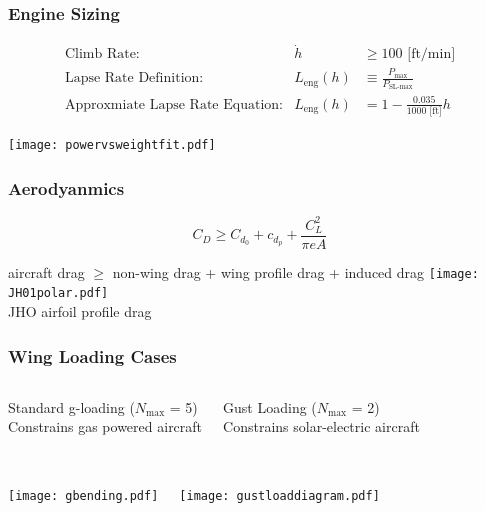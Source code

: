 \documentclass{beamer}
\begin{document}
\begin{frame}
    \frametitle{Engine Sizing}

    \scriptsize
    \[ \begin{array}{rrl}
            \text{Climb Rate}: & \dot{h} &\geq 100 \text{ [ft/min]} \\
            \text{Lapse Rate Definition}: &L_{\text{eng}}(h) &\equiv \frac{P_{\text{max}}}{P_{\text{SL-max}}} \\
            \text{Approxmiate Lapse Rate Equation}: & L_{\text{eng}}(h) &= 1 - \frac{0.035}{1000 \text{ [ft]}} h
    \end{array} \]

    \begin{center}
    \texttt{[image: powervsweightfit.pdf]}
    \end{center}

\end{frame}

\begin{frame}
    \frametitle{Aerodyanmics}

    \[ C_D \geq C_{d_0} + c_{d_p} + \frac{C_L^2}{\pi e A} \]

    \begin{center}
    aircraft drag $\geq$ non-wing drag + wing profile drag + induced drag
    \texttt{[image: JH01polar.pdf]} \\
    \scriptsize
    JHO airfoil profile drag
    \end{center}
    
\end{frame}

\begin{frame}
    \frametitle{Wing Loading Cases}
      
    \begin{columns}
        \begin{center}
        Standard g-loading ($N_{\text{max}}$ = 5) \\
        Constrains gas powered aircraft \\~\\
        \end{center}
        
        \begin{center}
        Gust Loading ($N_{\text{max}}$ = 2) \\
        Constrains solar-electric aircraft \\~\\
        \end{center}
    \end{columns}

    \begin{columns}
        \texttt{[image: gbending.pdf]}
        
        \texttt{[image: gustloaddiagram.pdf]}
    \end{columns}
\end{frame}
\end{document}
